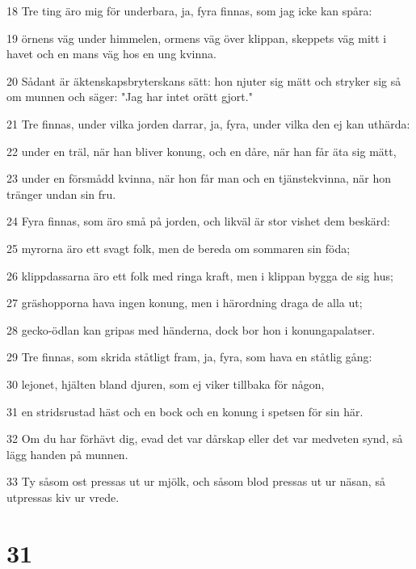 \par 18 Tre ting äro mig för underbara, ja, fyra finnas, som jag icke kan spåra:
\par 19 örnens väg under himmelen, ormens väg över klippan, skeppets väg mitt i havet och en mans väg hos en ung kvinna.
\par 20 Sådant är äktenskapsbryterskans sätt: hon njuter sig mätt och stryker sig så om munnen och säger: "Jag har intet orätt gjort."
\par 21 Tre finnas, under vilka jorden darrar, ja, fyra, under vilka den ej kan uthärda:
\par 22 under en träl, när han bliver konung, och en dåre, när han får äta sig mätt,
\par 23 under en försmådd kvinna, när hon får man och en tjänstekvinna, när hon tränger undan sin fru.
\par 24 Fyra finnas, som äro små på jorden, och likväl är stor vishet dem beskärd:
\par 25 myrorna äro ett svagt folk, men de bereda om sommaren sin föda;
\par 26 klippdassarna äro ett folk med ringa kraft, men i klippan bygga de sig hus;
\par 27 gräshopporna hava ingen konung, men i härordning draga de alla ut;
\par 28 gecko-ödlan kan gripas med händerna, dock bor hon i konungapalatser.
\par 29 Tre finnas, som skrida ståtligt fram, ja, fyra, som hava en ståtlig gång:
\par 30 lejonet, hjälten bland djuren, som ej viker tillbaka för någon,
\par 31 en stridsrustad häst och en bock och en konung i spetsen för sin här.
\par 32 Om du har förhävt dig, evad det var dårskap eller det var medveten synd, så lägg handen på munnen.
\par 33 Ty såsom ost pressas ut ur mjölk, och såsom blod pressas ut ur näsan, så utpressas kiv ur vrede.

\chapter{31}

